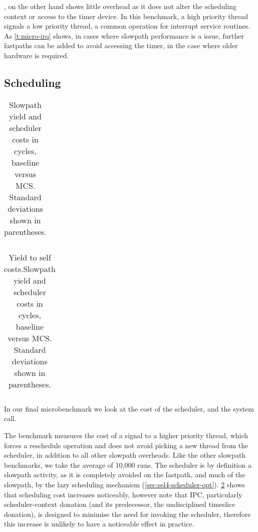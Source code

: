 , on the other hand shows little overhead as it does not alter the
scheduling context or access to the timer device.  In this benchmark, a high priority thread signals
a low priority thread, a common operation for interrupt service routines. As \cref{t:micro-irq}
shows, in 
cases where slowpath performance is a issue, further fastpaths can be added to avoid accessing the
timer, in the case where older hardware is required.

\subsection{Scheduling}

\begin{table}[t]\centering
    \begin{tabularx}{\textwidth}{Xlllllll}\toprule

\end{tabularx}
\caption[Slowpath scheduler costs.]{Slowpath yield and scheduler costs in cycles, baseline \selfour 
versus MCS. Standard deviations shown in parentheses.}
\label{t:micro-schedule}
\end{table}

\begin{table}[t]\centering
    \begin{tabularx}{\textwidth}{Xlllllll}\toprule

\end{tabularx}
\caption[Yield to self scheduler costs.]{Yield to self costs.Slowpath yield and scheduler costs in cycles, baseline \selfour 
versus MCS. Standard deviations shown in parentheses.}
\label{t:micro-schedule}
\end{table}

In our final microbenchmark we look at the cost of the scheduler, and the \yield system call. 

The  benchmark measures the cost of a signal to a higher priority thread, which forces 
a reschedule operation and does not avoid picking a new thread from the scheduler, in addition to
all other slowpath overheads. Like the other slowpath benchmarks, we take the average of 10,000
runs. 
The scheduler is by definition a slowpath activity, as it is completely avoided on the fastpath, and
much of the slowpath, by the lazy scheduling mechanism (\cref{sec:sel4-scheduler-opt}).
\cref{t:micro-schedule} shows that scheduling cost increases noticeably, however note that \selfour IPC,
particularly scheduler-context donation (and its predecessor, the
undisciplined timeslice donation), is designed to minimise the need for
invoking the scheduler, therefore this increase is unlikely to have
a noticeable effect in practice. 


